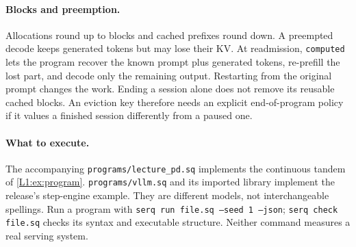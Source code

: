 \paragraph{Blocks and preemption.} Allocations round up to blocks and cached
prefixes round down. A preempted decode keeps generated tokens but may lose
their KV. At readmission, \texttt{computed} lets the program recover the
known prompt plus generated tokens, re-prefill the lost part, and decode only
the remaining output. Restarting from the original prompt changes the work.
Ending a session alone does not remove its reusable cached blocks.
An eviction key therefore needs an explicit end-of-program policy if it
values a finished session differently from a paused one.

\paragraph{What to execute.} The accompanying \texttt{programs/lecture\_pd.sq}
implements the continuous tandem of \cref{L1:ex:program}.
\texttt{programs/vllm.sq} and its imported library implement the release's
step-engine example. They are different models, not interchangeable
spellings. Run a program with \texttt{serq run file.sq --seed 1 --json};
\texttt{serq check file.sq} checks its syntax and executable structure.
Neither command measures a real serving system.
